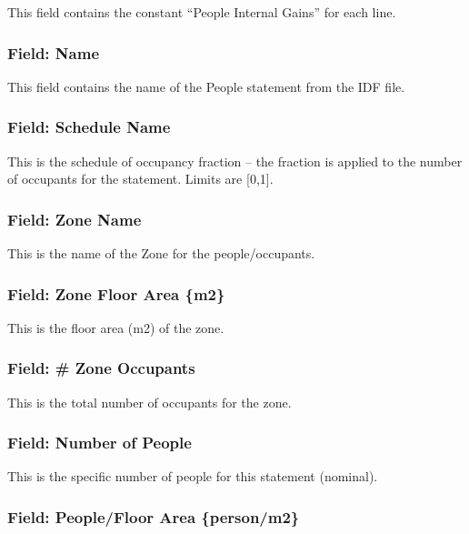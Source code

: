 This field contains the constant ``People Internal Gains'' for each line.

\subsubsection{Field: Name}\label{field-name-1}

This field contains the name of the People statement from the IDF file.

\subsubsection{Field: Schedule Name}\label{field-schedule-name}

This is the schedule of occupancy fraction -- the fraction is applied to the number of occupants for the statement. Limits are {[}0,1{]}.

\subsubsection{Field: Zone Name}\label{field-zone-name-2}

This is the name of the Zone for the people/occupants.

\subsubsection{Field: Zone Floor Area \{m2\}}\label{field-zone-floor-area-m2}

This is the floor area (m2) of the zone.

\subsubsection{Field: \# Zone Occupants}\label{field-zone-occupants}

This is the total number of occupants for the zone.

\subsubsection{Field: Number of People}\label{field-number-of-people}

This is the specific number of people for this statement (nominal).

\subsubsection{Field: People/Floor Area \{person/m2\}}\label{field-peoplefloor-area-personm2}

